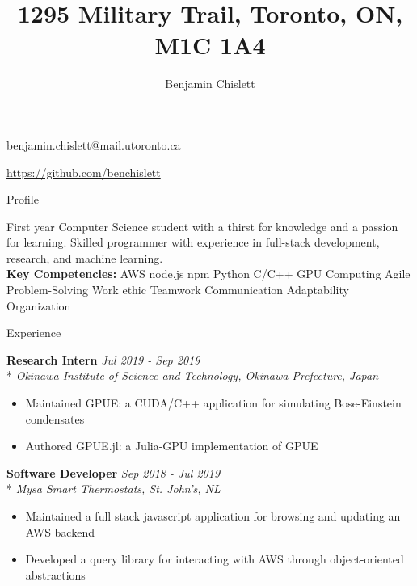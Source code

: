 \documentclass[11pt, letterpaper]{article}
\title{1295 Military Trail, Toronto, ON, M1C 1A4}
\author{Benjamin Chislett}
\date{}
\newcommand{\vbar}{\textbar\xspace}
\begin{document}
\begin{center}
  \Huge\theauthor
  \par
  \large\thetitle
  \par
  \large{benjamin.chislett@mail.utoronto.ca}
  \par
  \large\url{https://github.com/benchislett}
\end{center}

\begin{section}{Profile}

First year Computer Science student with a thirst for knowledge and a passion for learning.
Skilled programmer with experience in full-stack development, research, and machine learning.
\\

\textbf{Key Competencies:} AWS \vbar node.js \vbar npm \vbar Python \vbar C/C++ \vbar GPU Computing \vbar Agile \vbar Problem-Solving \vbar Work ethic \vbar Teamwork \vbar Communication \vbar Adaptability \vbar Organization

\end{section}

\begin{section}{Experience}

\textbf{Research Intern}
\hfill
\textit{Jul 2019 - Sep 2019}\\*
\textit{Okinawa Institute of Science and Technology, Okinawa Prefecture, Japan}

\begin{itemize}
  \item Maintained GPUE: a CUDA/C++ application for simulating Bose-Einstein condensates
  \item Authored GPUE.jl: a Julia-GPU implementation of GPUE\\
\end{itemize}

\textbf{Software Developer}
\hfill
\textit{Sep 2018 - Jul 2019}\\*
\textit{Mysa Smart Thermostats, St. John's, NL}
\begin{itemize}
  \item Maintained a full stack javascript application for browsing and updating an AWS backend
  \item Developed a query library for interacting with AWS through object-oriented abstractions
\end{itemize}

\end{section}
\end{document}
